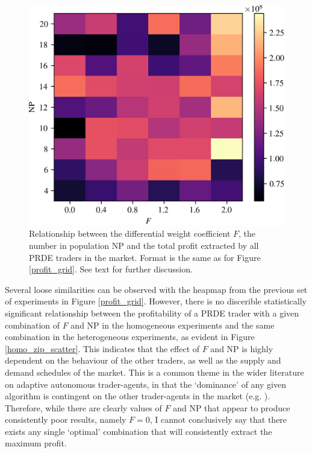 \documentclass[conference]{IEEEtran}
\begin{document}
\begin{figure}[htbp]
    \centerline{\includegraphics[width=\columnwidth]{zip_profit_grid.png}}
    \caption{
        Relationship between the differential weight coefficient $F$, the number in population $\mathrm{NP}$ and the total profit extracted by all PRDE traders in the market.
        Format is the same as for Figure \ref{profit_grid}.
        See text for further discussion.
    }
    \label{zip_profit_grid}
\end{figure}

Several loose similarities can be observed with the heapmap from the previous set of experiments in Figure \ref{profit_grid}.
However, there is no discerible statistically significant relationship between the profitability of a PRDE trader with a given combination of $F$ and $\mathrm{NP}$ in the homogeneous experiments and the same combination in the heterogeneous experiments, as evident in Figure \ref{homo_zip_scatter}.
This indicates that the effect of $F$ and $\mathrm{NP}$ is highly dependent on the behaviour of the other traders, as well as the supply and demand schedules of the market.
This is a common theme in the wider literature on adaptive autonomous trader-agents, in that the `dominance' of any given algorithm is contingent on the other trader-agents in the market (e.g. \cite{Vach}).
Therefore, while there are clearly values of $F$ and $\mathrm{NP}$ that appear to produce consistently poor results, namely $F=0$, I cannot conclusively say that there exists any single `optimal' combination that will consistently extract the maximum profit.
\end{document}
